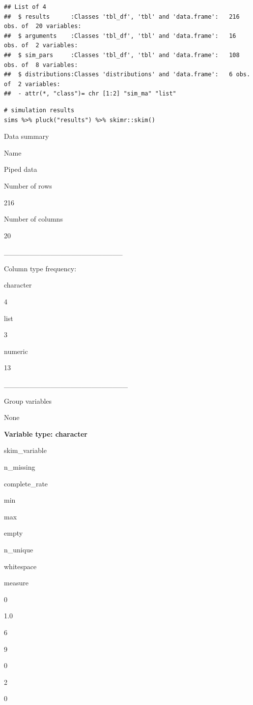 \documentclass[
]{article}
\begin{document}
\begin{verbatim}
## List of 4
##  $ results      :Classes 'tbl_df', 'tbl' and 'data.frame':   216 obs. of  20 variables:
##  $ arguments    :Classes 'tbl_df', 'tbl' and 'data.frame':   16 obs. of  2 variables:
##  $ sim_pars     :Classes 'tbl_df', 'tbl' and 'data.frame':   108 obs. of  8 variables:
##  $ distributions:Classes 'distributions' and 'data.frame':   6 obs. of  2 variables:
##  - attr(*, "class")= chr [1:2] "sim_ma" "list"
\end{verbatim}

\begin{verbatim}
# simulation results
sims %>% pluck("results") %>% skimr::skim()
\end{verbatim}

Data summary

Name

Piped data

Number of rows

216

Number of columns

20

\_\_\_\_\_\_\_\_\_\_\_\_\_\_\_\_\_\_\_\_\_\_\_

Column type frequency:

character

4

list

3

numeric

13

\_\_\_\_\_\_\_\_\_\_\_\_\_\_\_\_\_\_\_\_\_\_\_\_

Group variables

None

\textbf{Variable type: character}

skim\_variable

n\_missing

complete\_rate

min

max

empty

n\_unique

whitespace

measure

0

1.0

6

9

0

2

0
\end{document}
